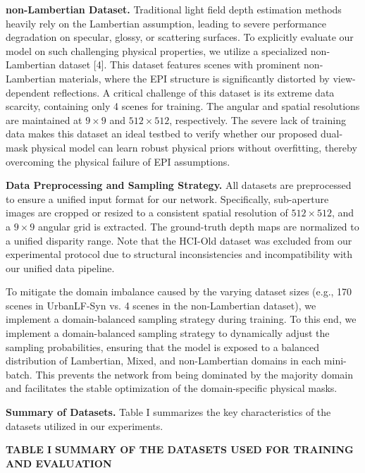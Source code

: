 \textbf{non-Lambertian Dataset.} Traditional light field depth estimation methods heavily rely on the Lambertian assumption, leading to severe performance degradation on specular, glossy, or scattering surfaces. To explicitly evaluate our model on such challenging physical properties, we utilize a specialized non-Lambertian dataset [4]. This dataset features scenes with prominent non-Lambertian materials, where the EPI structure is significantly distorted by view-dependent reflections. A critical challenge of this dataset is its extreme data scarcity, containing only 4 scenes for training. The angular and spatial resolutions are maintained at $9 \times 9$ and $512 \times 512$, respectively. The severe lack of training data makes this dataset an ideal testbed to verify whether our proposed dual-mask physical model can learn robust physical priors without overfitting, thereby overcoming the physical failure of EPI assumptions.

\textbf{Data Preprocessing and Sampling Strategy.} 
All datasets are preprocessed to ensure a unified input format for our network. Specifically, sub-aperture images are cropped or resized to a consistent spatial resolution of $512 \times 512$, and a $9 \times 9$ angular grid is extracted. The ground-truth depth maps are normalized to a unified disparity range. Note that the HCI-Old dataset was excluded from our experimental protocol due to structural inconsistencies and incompatibility with our unified data pipeline. 

To mitigate the domain imbalance caused by the varying dataset sizes (e.g., 170 scenes in UrbanLF-Syn vs. 4 scenes in the non-Lambertian dataset), we implement a domain-balanced sampling strategy during training. To this end, we implement a domain-balanced sampling strategy to dynamically adjust the sampling probabilities, ensuring that the model is exposed to a balanced distribution of Lambertian, Mixed, and non-Lambertian domains in each mini-batch. This prevents the network from being dominated by the majority domain and facilitates the stable optimization of the domain-specific physical masks.

\textbf{Summary of Datasets.} 
Table I summarizes the key characteristics of the datasets utilized in our experiments.

\textbf{TABLE I}
\textbf{SUMMARY OF THE DATASETS USED FOR TRAINING AND EVALUATION}

